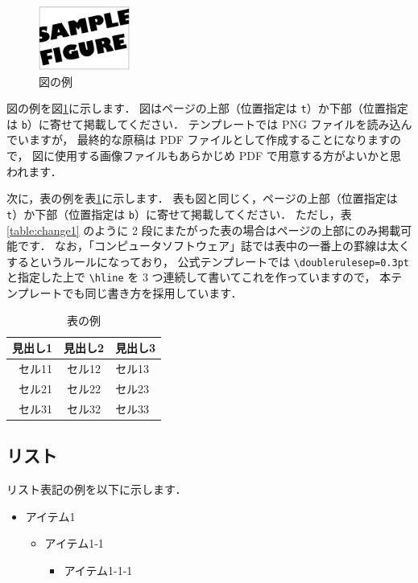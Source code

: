 \documentclass[T,J]{fose} %
\begin{document}
\begin{figure}[b]
	\centering
	\includegraphics[width=3.0cm]{image/sampleFig.png}
	\caption{図の例}
	\label{fig:figExample}
\end{figure}

図の例を図\ref{fig:figExample}に示します．
図はページの上部（位置指定は \texttt{t}）か下部（位置指定は \texttt{b}）に寄せて掲載してください．
テンプレートでは PNG ファイルを読み込んでいますが，
最終的な原稿は PDF ファイルとして作成することになりますので，
図に使用する画像ファイルもあらかじめ PDF で用意する方がよいかと思われます．

次に，表の例を表\ref{table:tableExample}に示します．
表も図と同じく，ページの上部（位置指定は \texttt{t}）か下部（位置指定は \texttt{b}）に寄せて掲載してください．
ただし，表 \ref{table:change1} のように 2 段にまたがった表の場合はページの上部にのみ掲載可能です．
なお，「コンピュータソフトウェア」誌では表中の一番上の罫線は太くするというルールになっており，
公式テンプレートでは \verb|\doublerulesep=0.3pt| と指定した上で \verb|\hline| を 3 つ連続して書いてこれを作っていますので，
本テンプレートでも同じ書き方を採用しています．

\begin{table}[tb]
	\centering
	\caption{表の例}
	\label{table:tableExample}
	\small
	\doublerulesep=0.3pt
	\begin{tabular}{rcl}
		\hline\hline\hline %
		見出し1 & 見出し2& 見出し3 \\ \hline
		セル11 & セル12 & セル13 \\ \hline
		セル21 & セル22 & セル23 \\ \hline
		セル31 & セル32 & セル33 \\ \hline
	\end{tabular}
\end{table}


\subsection{リスト}

リスト表記の例を以下に示します．

\begin{itemize}
	\item アイテム1
	\begin{itemize}
		\item アイテム1-1
		\begin{itemize}
			\item アイテム1-1-1
		\end{itemize}
	\end{itemize}
\end{itemize}
\end{document}
